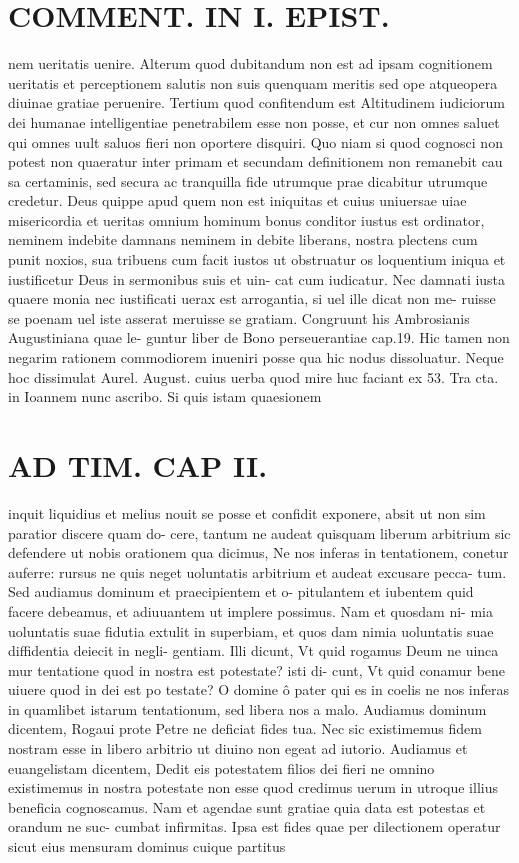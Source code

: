 \documentclass{article}
\begin{document}
\begin{pages}
\section*{COMMENT. IN I. EPIST. }\pstart nem ueritatis uenire. Alterum quod dubitandum non est ad ipsam cognitionem ueritatis et perceptionem salutis non suis quenquam meritis sed ope atqueopera diuinae gratiae peruenire. Tertium quod confitendum est Altitudinem iudiciorum dei humanae intelligentiae penetrabilem esse non posse, et cur non omnes saluet qui omnes uult saluos fieri non oportere disquiri. Quo niam si quod cognosci non potest non quaeratur inter primam et secundam definitionem non remanebit cau sa certaminis, sed secura ac tranquilla fide utrumque prae dicabitur utrumque credetur. Deus quippe apud quem non est iniquitas et cuius uniuersae uiae misericordia et ueritas omnium hominum bonus conditor iustus est ordinator, neminem indebite damnans neminem in debite liberans, nostra plectens cum punit noxios, sua tribuens cum facit iustos ut obstruatur os loquentium iniqua et iustificetur Deus in sermonibus suis et uin- cat cum iudicatur. Nec damnati iusta quaere monia nec iustificati uerax est arrogantia, si uel ille dicat non me- ruisse se poenam uel iste asserat meruisse se gratiam. Congruunt his Ambrosianis Augustiniana quae le- guntur liber  de Bono perseuerantiae cap.19. Hic tamen non negarim rationem commodiorem inueniri posse qua hic nodus dissoluatur. Neque hoc dissimulat Aurel. August. cuius uerba quod mire huc faciant ex 53. Tra cta. in Ioannem nunc ascribo. Si quis istam quaesionem  \pend
\section*{AD TIM. CAP II. }
\marginpar{[ p.114 ]}\pstart inquit liquidius et melius nouit se posse et confidit exponere, absit ut non sim paratior discere quam do- cere, tantum ne audeat quisquam liberum arbitrium sic defendere ut nobis orationem qua dicimus, Ne nos inferas in tentationem, conetur auferre: rursus ne quis neget uoluntatis arbitrium et audeat excusare pecca- tum. Sed audiamus dominum et praecipientem et o- pitulantem et iubentem quid facere debeamus, et adiuuantem ut implere possimus. Nam et quosdam ni- mia uoluntatis suae fidutia extulit in superbiam, et quos dam nimia uoluntatis suae diffidentia deiecit in negli- gentiam. Illi dicunt, Vt quid rogamus Deum ne uinca mur tentatione quod in nostra est potestate? isti di- cunt, Vt quid conamur bene uiuere quod in dei est po testate? O domine ô pater qui es in coelis ne nos inferas in quamlibet istarum tentationum, sed libera nos a malo. Audiamus dominum dicentem, Rogaui prote Petre ne deficiat fides tua. Nec sic existimemus fidem nostram esse in libero arbitrio ut diuino non egeat ad iutorio. Audiamus et euangelistam dicentem, Dedit eis potestatem filios dei fieri ne omnino existimemus in nostra potestate non esse quod credimus uerum in utroque illius beneficia cognoscamus. Nam et agendae sunt gratiae quia data est potestas et orandum ne suc- cumbat infirmitas. Ipsa est fides quae per dilectionem operatur sicut eius mensuram dominus cuique partitus  \pend

\end{pages}
\end{document}
